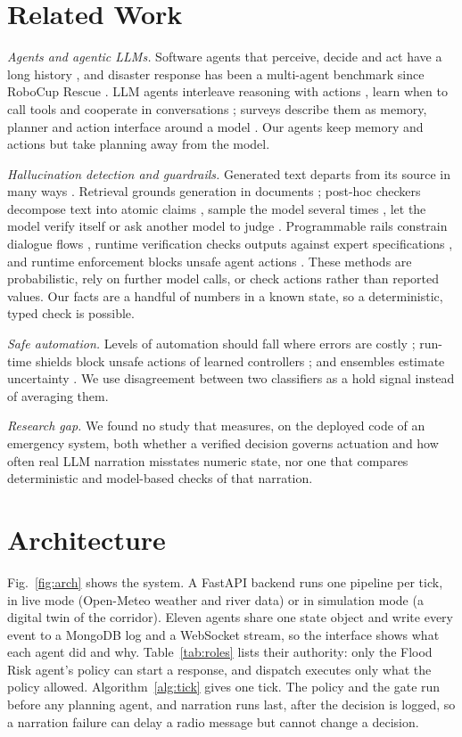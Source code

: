 \documentclass[conference]{IEEEtran}
\begin{document}
\section{Related Work}
\textit{Agents and agentic LLMs.} Software agents that perceive, decide and act have a long history \cite{Wooldridge1995}, and disaster response has been a multi-agent benchmark since RoboCup Rescue \cite{Kitano1999}. LLM agents interleave reasoning with actions \cite{Yao2023}, learn when to call tools \cite{Schick2023} and cooperate in conversations \cite{Wu2024}; surveys describe them as memory, planner and action interface around a model \cite{WangL2024}. Our agents keep memory and actions but take planning away from the model.

\textit{Hallucination detection and guardrails.} Generated text departs from its source in many ways \cite{Ji2023}. Retrieval grounds generation in documents \cite{Lewis2020}; post-hoc checkers decompose text into atomic claims \cite{Min2023}, sample the model several times \cite{Manakul2023}, let the model verify itself \cite{Dhuliawala2024} or ask another model to judge \cite{Zheng2023}. Programmable rails constrain dialogue flows \cite{Rebedea2023}, runtime verification checks outputs against expert specifications \cite{Zhang2025}, and runtime enforcement blocks unsafe agent actions \cite{WangH2026}. These methods are probabilistic, rely on further model calls, or check actions rather than reported values. Our facts are a handful of numbers in a known state, so a deterministic, typed check is possible.

\textit{Safe automation.} Levels of automation should fall where errors are costly \cite{Parasuraman2000}; run-time shields block unsafe actions of learned controllers \cite{Alshiekh2018}; and ensembles estimate uncertainty \cite{Dietterich2000,Lakshminarayanan2017}. We use disagreement between two classifiers as a hold signal instead of averaging them.

\textit{Research gap.} We found no study that measures, on the deployed code of an emergency system, both whether a verified decision governs actuation and how often real LLM narration misstates numeric state, nor one that compares deterministic and model-based checks of that narration.

\section{Architecture}
\label{sec:arch}
Fig.~\ref{fig:arch} shows the system. A FastAPI backend runs one pipeline per tick, in live mode (Open-Meteo weather and river data) or in simulation mode (a digital twin of the corridor). Eleven agents share one state object and write every event to a MongoDB log and a WebSocket stream, so the interface shows what each agent did and why. Table~\ref{tab:roles} lists their authority: only the Flood Risk agent's policy can start a response, and dispatch executes only what the policy allowed. Algorithm~\ref{alg:tick} gives one tick. The policy and the gate run before any planning agent, and narration runs last, after the decision is logged, so a narration failure can delay a radio message but cannot change a decision.
\end{document}
